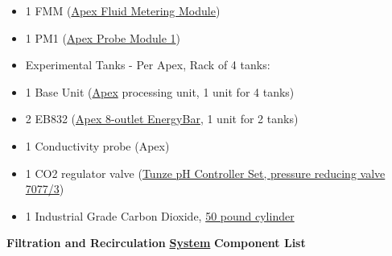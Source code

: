 \documentclass[]{book}
\begin{document}
\begin{itemize}
\item
  1 FMM (\href{https://www.neptunesystems.com/getstarted/fmk/}{Apex
  Fluid Metering Module})\\
\item
  1 PM1
  (\href{https://github.com/SilbigerLab/Mesocosm_User_Manual/blob/master/Manuals/PM1_manual.pdf}{Apex
  Probe Module 1})\\
\item
  Experimental Tanks - Per Apex, Rack of 4 tanks:\\
\item
  1 Base Unit
  (\href{https://github.com/SilbigerLab/Mesocosm_User_Manual/blob/master/Manuals/Apex_Comprehensive_Reference_Manual.pdf}{Apex}
  processing unit, 1 unit for 4 tanks)\\
\item
  2 EB832
  (\href{https://github.com/SilbigerLab/Mesocosm_User_Manual/blob/master/Manuals/EB832_Guide.pdf}{Apex
  8-outlet EnergyBar}, 1 unit for 2 tanks)\\
\item
  1 Conductivity probe (Apex)\\
\item
  1 CO2 regulator valve
  (\href{https://github.com/SilbigerLab/Mesocosm_User_Manual/blob/master/Manuals/Tunze_CO2_Regulator.pdf}{Tunze
  pH Controller Set, pressure reducing valve 7077/3})\\
\item
  1 Industrial Grade Carbon Dioxide,
  \href{https://www.airgas.com/product/Gases/Industrial-Application-Gases/Carbon-Dioxide---Industrial/p/CD\%2050}{50
  pound cylinder}
\end{itemize}

 \textbf{Filtration and Recirculation}
\href{https://github.com/SilbigerLab/Mesocosm_User_Manual/blob/master/Manuals/Filtration_Skid_Build_Package.pdf}{\textbf{System}}
\textbf{Component List}
\end{document}
